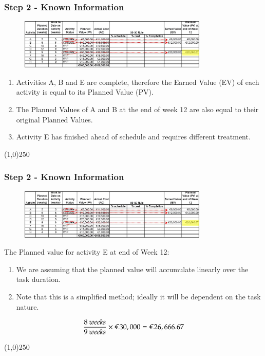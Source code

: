 \begin{frame}
\frametitle{Step 2 - Known Information}
\begin{figure}
	\centering
		\includegraphics[width = 9cm]{images/evmknown.jpg}
	\label{fig:evmknown}
\end{figure}

\begin{enumerate}
	\item Activities A, B and E are complete, therefore the Earned Value (EV) of each activity is equal to its Planned Value (PV).
	\item The Planned Values of A and B at the end of week 12 are also equal to their original Planned Values.
	\item Activity E has finished ahead of schedule and requires different treatment.
\end{enumerate}
\end{frame}
\begin{center}\line(1,0){250}\end{center}


\begin{frame}
\frametitle{Step 2 - Known Information}
\begin{figure}
	\centering
		\includegraphics[width = 9cm]{images/evmknown.jpg}
	\label{fig:evmknown}
\end{figure}
The Planned value for activity E at end of Week 12:
\begin{enumerate}
	\item We are assuming that the planned value will accumulate linearly over the task duration.
	\item Note that this is a simplified method; ideally it will be dependent on the task nature.
\end{enumerate}
\[
\frac{8 \: weeks}{9 \: weeks} \times \text{\euro}30,000 = \text{\euro}26,666.67
\]
\end{frame}
\begin{center}\line(1,0){250}\end{center}



